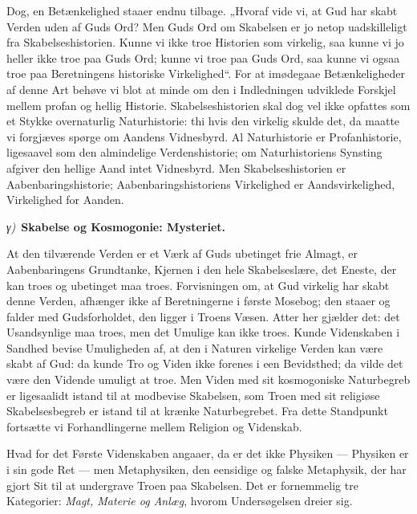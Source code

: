 \documentclass[12pt]{book}
\newcommand{\greekrun}[2]{%
  \medskip\begin{center}{\itshape #1)}\ {\bfseries #2}\end{center}\medskip}
\begin{document}
Dog, en Betænkelighed staaer endnu tilbage. „Hvoraf vide vi, at Gud
har skabt Verden uden af Guds Ord? Men Guds Ord om Skabelsen er jo
netop uadskilleligt fra Skabelseshistorien. Kunne vi ikke troe
Historien som virkelig, saa kunne vi jo heller ikke troe paa Guds
Ord;
kunne vi troe paa Guds Ord, saa kunne vi ogsaa troe paa Beretningens
historiske Virkelighed“. For at imødegaae Betænkeligheder af denne
Art behøve vi blot at minde om den i Indledningen udviklede Forskjel
mellem profan og hellig Historie. Skabelseshistorien skal dog vel
ikke opfattes som et Stykke overnaturlig Naturhistorie: thi hvis den
virkelig skulde det, da maatte vi forgjæves spørge om Aandens
Vidnesbyrd. Al Naturhistorie er Profanhistorie, ligesaavel som den
almindelige Verdenshistorie; om Naturhistoriens Synsting afgiver den
hellige Aand intet Vidnesbyrd. Men Skabelseshistorien er
Aabenbaringshistorie; Aabenbaringshistoriens Virkelighed er
Aandsvirkelighed, Virkelighed for Aanden.

\greekrun{γ}{Skabelse og Kosmogonie: Mysteriet.}

At den tilværende Verden er et Værk af Guds ubetinget frie Almagt,
er Aabenbaringens Grundtanke, Kjernen i den hele Skabelseslære, det
Eneste, der kan troes og ubetinget maa troes. Forvisningen om, at
Gud virkelig har skabt denne Verden, afhænger ikke af Beretningerne
i første Mosebog; den staaer og falder med Gudsforholdet, den ligger
i Troens Væsen. Atter her gjælder det: det Usandsynlige maa troes,
men det Umulige kan ikke troes. Kunde Videnskaben i Sandhed bevise
Umuligheden af, at den i Naturen virkelige Verden kan være skabt af
Gud: da kunde Tro og Viden ikke forenes i een Bevidsthed; da vilde
det være den Vidende umuligt at troe. Men Viden med sit kosmogoniske
Naturbegreb er ligesaalidt istand til at modbevise Skabelsen, som
Troen med sit religiøse Skabelsesbegreb er istand til at krænke
Naturbegrebet. Fra dette Standpunkt fortsætte vi Forhandlingerne
mellem Religion og Videnskab.

Hvad for det Første Videnskaben angaaer, da er det ikke Physiken ---
Physiken er i sin gode Ret --- men Metaphysiken, den eensidige og
falske Metaphysik, der
har gjort Sit til at undergrave Troen paa Skabelsen. Det er
fornemmelig tre Kategorier: \emph{Magt, Materie og Anlæg}, hvorom
Undersøgelsen dreier sig.
\end{document}
